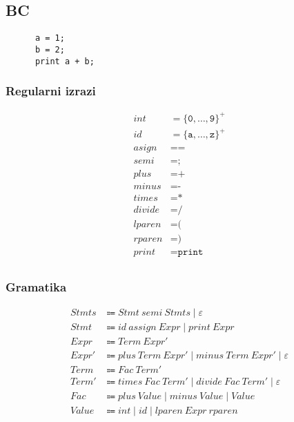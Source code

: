 \documentclass{report}
\newcommand{\Null}{\varepsilon}
\newcommand{\Char}[1]{\texttt{#1}}
\newcommand{\Spc}{\ }
\newcommand{\Union}{\mathrel{|}}
\newcommand{\KleenePlus}[1]{#1^+}
\newcommand{\Arrow}{\Coloneq}
\newcommand{\NT}[1]{{#1}}
\newcommand{\T}[1]{{#1}}
\begin{document}
    \subsection{BC}
    \begin{verbatim}
      a = 1;
      b = 2;
      print a + b;
    \end{verbatim}

    \subsubsection*{Regularni izrazi}
    \begin{equation*}
      \begin{aligned}
        \T{int} &= \KleenePlus{\{\Char{0}, \dots, \Char{9}\}}\\
        \T{id} &= \KleenePlus{\{\Char{a}, \dots, \Char{z}\}}\\
        \T{asign} &= \Char{=}\\
        \T{semi} &= \Char{;}\\
        \T{plus} &= \Char{+}\\
        \T{minus} &= \Char{-}\\
        \T{times} &= \Char{*}\\
        \T{divide} &= \Char{/}\\
        \T{lparen} &= \Char{(}\\
        \T{rparen} &= \Char{)}\\
        \T{print} &= \Char{print}\\
      \end{aligned}
    \end{equation*}

    \subsubsection*{Gramatika}
    \begin{equation*}
      \begin{aligned}
        \NT{Stmts} &\Arrow \NT{Stmt} \Spc \T{semi} \Spc \NT{Stmts} \Union \Null\\
        \NT{Stmt} &\Arrow \T{id} \Spc \T{assign} \Spc \NT{Expr} \Union \T{print} \Spc \NT{Expr}\\
        \NT{Expr} &\Arrow \NT{Term} \Spc \NT{Expr'}\\
        \NT{Expr'} &\Arrow \T{plus} \Spc \NT{Term} \Spc \NT{Expr'} \Union \T{minus} \Spc \NT{Term} \Spc \NT{Expr'} \Union \Null\\
        \NT{Term} &\Arrow \NT{Fac} \Spc \NT{Term'}\\
        \NT{Term'} &\Arrow \T{times} \Spc \NT{Fac} \Spc \NT{Term'} \Union \T{divide} \Spc \NT{Fac} \Spc \NT{Term'} \Union \Null\\
        \NT{Fac} &\Arrow \T{plus} \Spc \NT{Value} \Union \T{minus} \Spc \NT{Value} \Union \NT{Value}\\
        \NT{Value} &\Arrow \T{int} \Union \T{id} \Union \T{lparen} \Spc \NT{Expr} \Spc \T{rparen}
      \end{aligned}
    \end{equation*}
\end{document}
